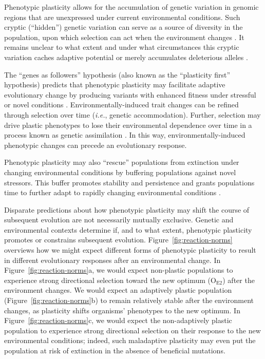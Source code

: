 \documentclass[utf8]{frontiersSCNS} %
\begin{document}
\begin{raggedbottom}
Phenotypic plasticity allows for the accumulation of genetic variation in genomic regions that are unexpressed under current environmental conditions.
Such cryptic (``hidden'') genetic variation can serve as a source of diversity in the population, upon which selection can act when the environment changes \citep{schlichting_hidden_2008,levis_evaluating_2016}.
It remains unclear to what extent and under what circumstances this cryptic variation caches adaptive potential or merely accumulates deleterious alleles \citep{gibson_uncovering_2004,paaby_cryptic_2014,zheng_cryptic_2019}.

The ``genes as followers'' hypothesis (also known as the ``plasticity first'' hypothesis) predicts that phenotypic plasticity may facilitate adaptive evolutionary change by producing variants with enhanced fitness under stressful or novel conditions \citep{west-eberhard_developmental_2003,schwander_genes_2011,levis_evaluating_2016}.
Environmentally-induced trait changes can be refined through selection over time (\textit{i.e.}, genetic accommodation).
Further, selection may drive plastic phenotypes to lose their environmental dependence over time in a process known as genetic assimilation \citep{west-eberhard_developmental_2005,pigliucci_phenotypic_2006,crispo_baldwin_2007,schlichting_phenotypic_2014,levis_evaluating_2016}.
In this way, environmentally-induced phenotypic changes can precede an evolutionary response.

Phenotypic plasticity may also ``rescue'' populations from extinction under changing environmental conditions by buffering populations against novel stressors.
This buffer promotes stability and persistence and grants populations time to further adapt to rapidly changing environmental conditions \citep{west-eberhard_developmental_2003,chevin_when_2010}.

Disparate predictions about how phenotypic plasticity may shift the course of subsequent evolution are not necessarily mutually exclusive.
Genetic and environmental contexts determine if, and to what extent, phenotypic plasticity promotes or constrains subsequent evolution.
Figure~\ref{fig:reaction-norms} overviews how we might expect different forms of phenotypic plasticity to result in different evolutionary responses after an environmental change.
In Figure~\ref{fig:reaction-norms}a, we would expect non-plastic populations to experience strong directional selection toward the new optimum (O$_{\text{E}2}$) after the environment changes.
We would expect an adaptively plastic population (Figure~\ref{fig:reaction-norms}b) to remain relatively stable after the environment changes, as plasticity shifts organisms' phenotypes to the new optimum.
In Figure~\ref{fig:reaction-norms}c, we would expect the non-adaptively plastic population to experience strong directional selection on their response to the new environmental conditions; indeed, such maladaptive plasticity may even put the population at risk of extinction in the absence of beneficial mutations.


\end{raggedbottom}
\end{document}
